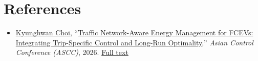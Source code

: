 \documentclass[a4paper]{article}
\begin{document}
\section{References}

\begin{itemize}
  \item
    \href{https://kaist-mic-lab.github.io/members/khChoi/}{Kyunghwan Choi},
    ``\href{https://kaist-mic-lab.github.io/publications/2026-traffic-network/}{Traffic
    Network-Aware Energy Management for FCEVs: Integrating Trip-Specific
    Control and Long-Run Optimality},''
    \textit{Asian Control Conference (ASCC)}, 2026.
    \href{https://kaist-mic-lab.github.io/static/pub/2026-traffic-network.pdf}{Full text}
\end{itemize}





\end{document}
